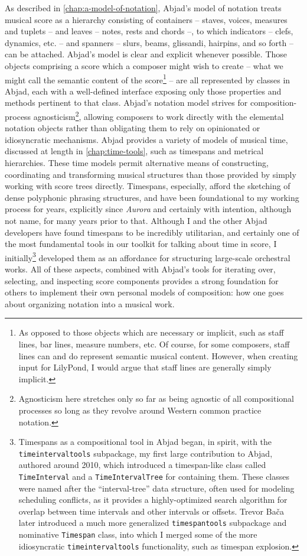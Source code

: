 As described in \autoref{chap:a-model-of-notation}, Abjad's model of notation
treats musical score as a hierarchy consisting of containers -- staves, voices,
measures and tuplets -- and leaves -- notes, rests and chords --, to which
indicators -- clefs, dynamics, etc. -- and spanners -- slurs, beams, glissandi,
hairpins, and so forth -- can be attached. Abjad's model is clear and explicit
whenever possible. Those objects comprising a score which a composer might wish
to create -- what we might call the semantic content of the score\footnote{ As
opposed to those objects which are necessary or implicit, such as staff lines,
bar lines, measure numbers, etc. Of course, for some composers, staff lines can
and do represent semantic musical content. However, when creating input for
LilyPond, I would argue that staff lines are generally simply implicit. } --
are all represented by classes in Abjad, each with a well-defined interface
exposing only those properties and methods pertinent to that class. Abjad's
notation model strives for composition-process agnosticism\footnote{
Agnosticism here stretches only so far as being agnostic of all compositional
processes so long as they revolve around Western common practice notation. },
allowing composers to work directly with the elemental notation objects rather
than obligating them to rely on opinionated or idiosyncratic mechanisms. Abjad
provides a variety of models of musical time, discussed at length in
\autoref{chap:time-tools}, such as timespans and metrical hierarchies. These
time models permit alternative means of constructing, coordinating and
transforming musical structures than those provided by simply working with
score trees directly. Timespans, especially, afford the sketching of dense
polyphonic phrasing structures, and have been foundational to my working
process for years, explicitly since \emph{Aurora} and certainly with intention,
although not name, for many years prior to that. Although I and the other Abjad
developers have found timespans to be incredibly utilitarian, and certainly one
of the most fundamental tools in our toolkit for talking about time in score, I
initially\footnote{ Timespans as a compositional tool in Abjad began, in
spirit, with the \texttt{timeintervaltools} subpackage, my first large
contribution to Abjad, authored around 2010, which introduced a timespan-like
class called \texttt{TimeInterval} and a \texttt{TimeIntervalTree} for
containing them. These classes were named after the \enquote{interval-tree}
data structure, often used for modeling scheduling conflicts, as it provides a
highly-optimized search algorithm for overlap between time intervals and other
intervals or offsets. Trevor Ba\v{c}a later introduced a much more generalized
\texttt{timespantools} subpackage and nominative \texttt{Timespan} class, into
which I merged some of the more idiosyncratic \texttt{timeintervaltools}
functionality, such as timespan explosion. } developed them as an affordance
for structuring large-scale orchestral works. All of these aspects, combined
with Abjad's tools for iterating over, selecting, and inspecting score
components provides a strong foundation for others to implement their own
personal models of composition: how one goes about organizing notation into a
musical work.

